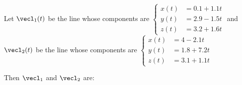 \documentclass{ximera}
\author{Gregory Hartman \and Matthew Carr}
\begin{document}
\begin{exercise}
Let $\vecl_{1}(t)$ be the line whose components are $\left\{ \begin{aligned}
x(t) & =0.1+1.1t\\
y(t) & =2.9-1.5t\\
z(t) & =3.2+1.6t
\end{aligned}
\right.$  and $\vecl_{2}(t)$ be the line whose components are $\left\{ \begin{aligned}
x(t) & =4-2.1t\\
y(t) & =1.8+7.2t\\
z(t) & =3.1+1.1t
\end{aligned}
\right.$

Then $\vecl_{1}$ and $\vecl_{2}$ are: 

\begin{multipleChoice}
\end{multipleChoice}


\end{exercise}
\end{document}
